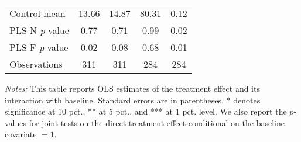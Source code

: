 \begin{table}[ht]
{\begin{threeparttable}
\begin{tabular}{l*{4}{c}}
Control mean    &    13.66         &    14.87         &    80.31         &     0.12         \\
PLS-N \emph{p}-value&     0.77         &     0.71         &     0.99         &     0.02         \\
PLS-F \emph{p}-value&     0.02         &     0.08         &     0.68         &     0.01         \\
Observations    &      311         &      311         &      284         &      284         \\
\bottomrule \end{tabular} \begin{tablenotes}[flushleft] \footnotesize \item \emph{Notes:} This table reports OLS estimates of the treatment effect and its interaction with baseline. Standard errors are in parentheses. * denotes significance at 10 pct., ** at 5 pct., and *** at 1 pct. level. We also report the \(p\)-values for joint tests on the direct treatment effect conditional on the baseline covariate $= 1$. \end{tablenotes} \end{threeparttable} } \end{table}

